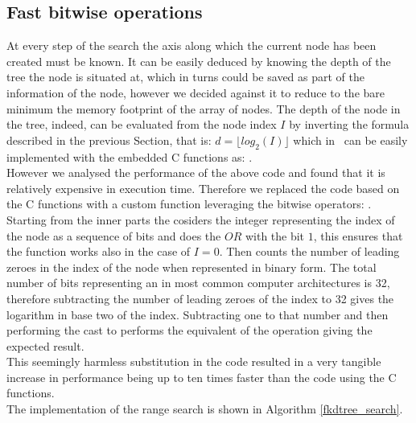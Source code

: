 \subsection{Fast bitwise operations}
At every step of the search the axis along which the current node has been created must be known. It can be easily deduced by knowing the depth of the tree the node is situated at, which in turns could be saved as part of the information of the node, however we decided against it to reduce to the bare minimum the memory footprint of the array of nodes. The depth of the node in the tree, indeed, can be evaluated from the node index $I$ by inverting the formula described in the previous Section, that is: $d = \lfloor log_2(I) \rfloor$ which in \CC\ can be easily implemented with the embedded C functions as: .\\
However we analysed the performance of the above code and found that it is relatively expensive in execution time. Therefore we replaced the code based on the C functions with a custom function leveraging the bitwise operators: . Starting from the inner parts the  cosiders the integer representing the index of the node as a sequence of bits and does the $OR$ with the bit $1$, this ensures that the function works also in the case of $I = 0$. Then  counts the number of leading zeroes in the index of the node when represented in binary form. The total number of bits representing an  in most common computer architectures is 32, therefore subtracting the number of leading zeroes of the index to 32 gives the logarithm in base two of the index. Subtracting one to that number and then performing the cast to  performs the equivalent of the  operation giving the expected result.\\
This seemingly harmless substitution in the code resulted in a very tangible increase in performance being up to ten times faster than the code using the C functions.\\
The implementation of the range search is shown in Algorithm \ref{fkdtree_search}.\\

